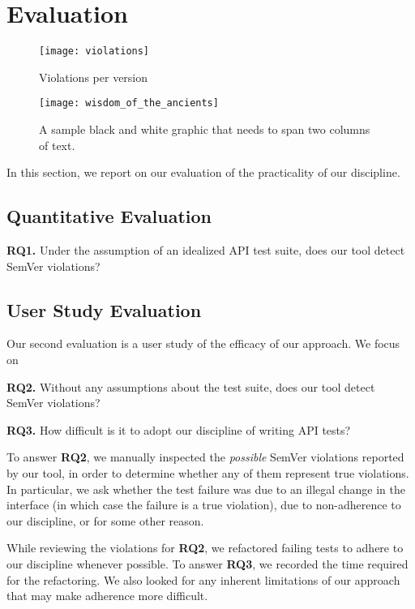 \section{Evaluation}

\begin{figure}
\centering
\texttt{[image: violations]}
\caption{Violations per version}
\end{figure}

\begin{figure*}
\centering
\texttt{[image: wisdom\_of\_the\_ancients]}
\caption{A sample black and white graphic
that needs to span two columns of text.}
\end{figure*}

In this section, we report on our evaluation of the practicality of
our discipline. 

\subsection{Quantitative Evaluation}

{\bf RQ1.} Under the assumption of an idealized API test suite, does
our tool detect SemVer violations?

\subsection{User Study Evaluation}
Our second evaluation is a user study of the efficacy of our
approach. We focus on 

{\bf RQ2.} Without any assumptions about the test suite, does our tool
detect SemVer violations?

{\bf RQ3.} How difficult is it to adopt our discipline of writing API
tests?

To answer {\bf RQ2}, we manually inspected the {\em possible} SemVer
violations reported by our tool, in order to determine whether any of
them represent true violations. In particular, we ask whether the test
failure was due to an illegal change in the interface (in which case
the failure is a true violation), due to non-adherence to our
discipline, or for some other reason.

While reviewing the violations for {\bf RQ2}, we refactored failing
tests to adhere to our discipline whenever possible. To answer {\bf
  RQ3}, we recorded the time required for the refactoring. We also
looked for any inherent limitations of our approach that may make
adherence more difficult.

